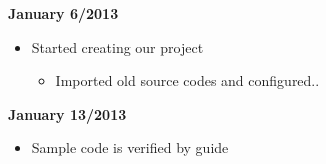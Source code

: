 \documentclass[11pt,a4paper,twoside]{report}
\begin{document}
\begin{appendix}
\begin{flushleft}
\begin{itemize}
\end{itemize}
\textbf{January 6/2013}
\begin{itemize}
\item Started creating our project
\begin{itemize}
\item Imported old source codes and configured..
\end{itemize}
\end{itemize}

\textbf{January 13/2013}
\begin{itemize}
\item Sample code is verified by guide

\end{itemize}
 
\end{flushleft}
\end{appendix}
\end{document}
